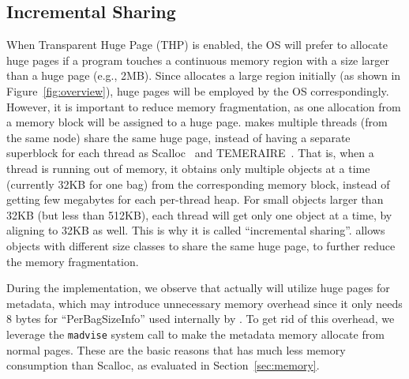 \subsection{Incremental Sharing}
\label{sec:hugepages}
When Transparent Huge Page (THP) is enabled, the OS will prefer to allocate huge pages if a program touches a continuous memory region with a size larger than a huge page (e.g., 2MB). Since \NM{} allocates a large region initially (as shown in Figure~\ref{fig:overview}), huge pages will be employed by the OS correspondingly. However, it is important to reduce memory fragmentation, as one allocation from a memory block will be assigned to a huge page.
\NM{} makes multiple threads (from the same node) share the same huge page, instead of having a separate superblock for each thread as Scalloc~\cite{Scalloc} and TEMERAIRE~\cite{TEMERAIRE}. That is, when a thread is running out of memory, it obtains only multiple objects at a time (currently 32KB for one bag) from the corresponding memory block, instead of getting few megabytes for each per-thread heap. For small objects larger than 32KB (but less than 512KB), each thread will get only one object at a time, by aligning to 32KB as well. This is why it is called ``incremental sharing''.
\NM{} allows objects with different size classes to share the same huge page, to further reduce the memory fragmentation.


During the implementation, we observe that \NM{} actually will utilize huge pages for metadata, which may introduce unnecessary memory overhead since it only needs 8 bytes for ``PerBagSizeInfo'' used internally by \NM{}. To get rid of this overhead, we leverage the \texttt{madvise} system call to make the metadata memory allocate from normal pages. These are the basic reasons that \NM{} has much less memory consumption than Scalloc, as evaluated in Section~\ref{sec:memory}. 

